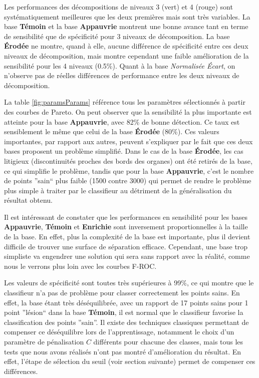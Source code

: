 Les performances des décompositions de niveaux 3 (vert) et 4 (rouge) sont systématiquement meilleures que les deux premières mais sont très variables. La base \textbf{Témoin} et la base \textbf{Appauvrie} montrent une bonne avance tant en terme de sensibilité que de spécificité pour 3 niveaux de décomposition. La base \textbf{Érodée} ne montre, quand à elle, aucune différence de spécificité entre ces deux niveaux de décomposition, mais montre cependant une faible amélioration de la sensibilité pour les 4 niveaux (0.5\%). Quant à la base \emph{Normalisée \'Ecart}, on n'observe pas de réelles différences de performance entre les deux niveaux de décomposition.

La table \ref{fig:paramsParams} référence tous les paramètres sélectionnés à partir des courbes de Pareto. On peut observer que la sensibilité la plus importante est atteinte pour la base \textbf{Appauvrie}, avec 82\% de bonne détection. Ce taux est sensiblement le même que celui de la base \textbf{Érodée} (80\%). Ces valeurs importantes, par rapport aux autres, peuvent s'expliquer par le fait que ces deux bases proposent un problème simplifié. Dans le cas de la base \textbf{Érodée}, les cas litigieux (discontinuités proches des bords des organes) ont été retirés de la base, ce qui simplifie le problème, tandis que pour la base \textbf{Appauvrie}, c'est le nombre de points ''sain`` plus faible (1500 contre 3000) qui permet de rendre le problème plus simple à traiter par le classifieur  au détriment de la généralisation du résultat obtenu.

Il est intéressant de constater que les performances en sensibilité pour les bases \textbf{Appauvrie}, \textbf{Témoin} et \textbf{Enrichie} sont inversement proportionnelles à la taille de la base. En effet, plus la complexité de la base est importante, plus il devient difficile de trouver une surface de séparation efficace. Cependant, une base trop simpliste va engendrer une solution qui sera sans rapport avec la réalité, comme nous le verrons plus loin avec les courbes F-ROC.

Les valeurs de spécificité sont toutes très supérieures à 99\%, ce qui montre que le classifieur n'a pas de problème pour classer correctement les points sains. En effet, la base étant très déséquilibrée, avec un rapport de 17 points sains pour 1 point ''lésion`` dans la base \textbf{Témoin}, il est normal que le classifieur favorise la classification des points ''sain''. Il existe des techniques classiques permettant de compenser ce déséquilibre lors de l'apprentissage, notamment le choix d'un paramètre de pénalisation $C$ différents pour chacune des classes, mais tous les tests que nous avons réalisés n'ont pas montré d'amélioration du résultat. En effet, l'étape de sélection du seuil (voir section suivante) permet de compenser ces différences.

